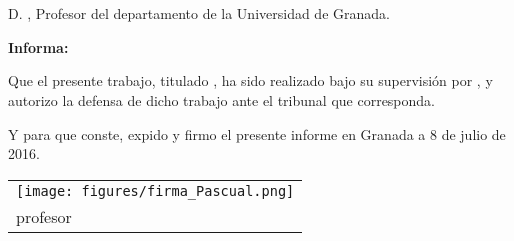 
\chapter*{}


D. \textbf{\@degree}, Profesor del departamento de la Universidad de Granada.

\vspace{0.5cm}

\textbf{Informa:}

\vspace{0.5cm}

Que el presente trabajo, titulado \textit{\textbf{\@title}}, ha sido realizado bajo su supervisión por \textbf{\@author}, y autorizo la defensa de dicho trabajo ante el tribunal que corresponda.

\vspace{0.5cm}

Y para que conste, expido y firmo el presente informe en Granada a 8 de julio de 2016.

\vspace{3cm}

\begin{flushright}
    \begin{tabular}{m{5cm}}
        \centering\texttt{[image: figures/firma\_Pascual.png]} \\
        \centering profesor \\
    \end{tabular}
\end{flushright}
